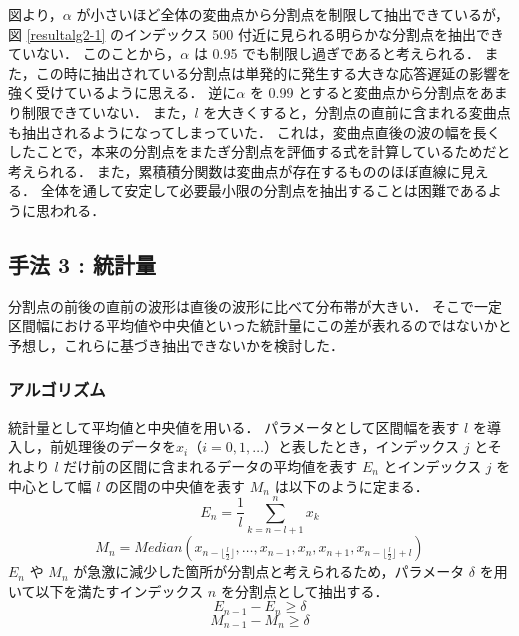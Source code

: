 \documentclass[a4j]{jarticle}
\begin{document}
図より，$\alpha$ が小さいほど全体の変曲点から分割点を制限して抽出できているが，図 \ref{resultalg2-1} のインデックス 500 付近に見られる明らかな分割点を抽出できていない．
このことから，$\alpha$ は 0.95 でも制限し過ぎであると考えられる．
また，この時に抽出されている分割点は単発的に発生する大きな応答遅延の影響を強く受けているように思える．
逆に$\alpha$ を 0.99 とすると変曲点から分割点をあまり制限できていない．
また，$l$ を大きくすると，分割点の直前に含まれる変曲点も抽出されるようになってしまっていた．
これは，変曲点直後の波の幅を長くしたことで，本来の分割点をまたぎ分割点を評価する式を計算しているためだと考えられる．
また，累積積分関数は変曲点が存在するもののほぼ直線に見える．
全体を通して安定して必要最小限の分割点を抽出することは困難であるように思われる．

\subsection{手法 3 : 統計量}
分割点の前後の直前の波形は直後の波形に比べて分布帯が大きい．
そこで一定区間幅における平均値や中央値といった統計量にこの差が表れるのではないかと予想し，これらに基づき抽出できないかを検討した．

\subsubsection{アルゴリズム}
統計量として平均値と中央値を用いる．
パラメータとして区間幅を表す $l$ を導入し，前処理後のデータを$x_i （i = 0,1,\ldots）$と表したとき，インデックス $j$ とそれより $l$ だけ前の区間に含まれるデータの平均値を表す $E_n$ とインデックス $j$ を中心として幅 $l$ の区間の中央値を表す $M_n$ は以下のように定まる．
$$E_n = \frac{1}{l} \sum^n_{k=n-l+1} x_k$$
$$M_n = Median\left(x_{n-\lfloor \frac{l}{2}\rfloor},\ldots,x_{n-1},x_n,x_{n+1},x_{n - \lfloor \frac{l}{2}\rfloor + l}\right)$$
$E_n$ や $M_n$ が急激に減少した箇所が分割点と考えられるため，パラメータ $\delta$ を用いて以下を満たすインデックス $n$ を分割点として抽出する．
$$E_{n-1} - E_n \geq \delta$$
$$M_{n-1} - M_n \geq \delta$$
\end{document}
